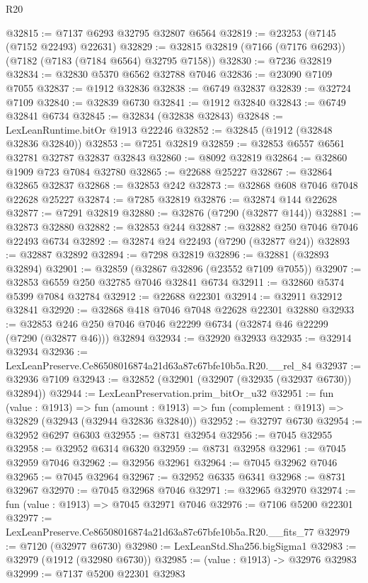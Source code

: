 \begin{lexlean}{R20}
\begin{coremodule}
{@32815 := @7137 @6293 @32795 @32807 @6564
@32819 := @23253 (@7145 (@7152 @22493) @22631)
@32829 := @32815 @32819 (@7166 (@7176 @6293)) (@7182 (@7183 (@7184 @6564) @32795 @7158))
@32830 := @7236 @32819
@32834 := @32830 @5370 @6562 @32788 @7046
@32836 := @23090 @7109 @7055
@32837 := @1912 @32836
@32838 := @6749 @32837
@32839 := @32724 @7109
@32840 := @32839 @6730
@32841 := @1912 @32840
@32843 := @6749 @32841 @6734
@32845 := @32834 (@32838 @32843)
@32848 := LexLeanRuntime.bitOr @1913 @22246
@32852 := @32845 (@1912 (@32848 @32836 @32840))
@32853 := @7251 @32819
@32859 := @32853 @6557 @6561 @32781 @32787 @32837 @32843
@32860 := @8092 @32819
@32864 := @32860 @1909 @723 @7084 @32780
@32865 := @22688 @25227
@32867 := @32864 @32865 @32837
@32868 := @32853 @242
@32873 := @32868 @608 @7046 @7048 @22628 @25227
@32874 := @7285 @32819
@32876 := @32874 @144 @22628
@32877 := @7291 @32819
@32880 := @32876 (@7290 (@32877 @144))
@32881 := @32873 @32880
@32882 := @32853 @244
@32887 := @32882 @250 @7046 @7046 @22493 @6734
@32892 := @32874 @24 @22493 (@7290 (@32877 @24))
@32893 := @32887 @32892
@32894 := @7298 @32819
@32896 := @32881 (@32893 @32894)
@32901 := @32859 (@32867 @32896 (@23552 @7109 @7055))
@32907 := @32853 @6559 @250 @32785 @7046 @32841 @6734
@32911 := @32860 @5374 @5399 @7084 @32784
@32912 := @22688 @22301
@32914 := @32911 @32912 @32841
@32920 := @32868 @418 @7046 @7048 @22628 @22301 @32880
@32933 := @32853 @246 @250 @7046 @7046 @22299 @6734 (@32874 @46 @22299 (@7290 (@32877 @46))) @32894
@32934 := @32920 @32933
@32935 := @32914 @32934
@32936 := LexLeanPreserve.Ce86508016874a21d63a87c67bfe10b5a.R20.__rel_84
@32937 := @32936 @7109
@32943 := @32852 (@32901 (@32907 (@32935 (@32937 @6730)) @32894))
@32944 := LexLeanPreservation.prim_bitOr_u32
@32951 := fun (value : @1913) =>
  fun (amount : @1913) => fun (complement : @1913) => @32829 (@32943 (@32944 @32836 @32840))
@32952 := @32797 @6730
@32954 := @32952 @6297 @6303
@32955 := @8731 @32954
@32956 := @7045 @32955
@32958 := @32952 @6314 @6320
@32959 := @8731 @32958
@32961 := @7045 @32959 @7046
@32962 := @32956 @32961
@32964 := @7045 @32962 @7046
@32965 := @7045 @32964
@32967 := @32952 @6335 @6341
@32968 := @8731 @32967
@32970 := @7045 @32968 @7046
@32971 := @32965 @32970
@32974 := fun (value : @1913) => @7045 @32971 @7046
@32976 := @7106 @5200 @22301
@32977 := LexLeanPreserve.Ce86508016874a21d63a87c67bfe10b5a.R20.__fits_77
@32979 := @7120 (@32977 @6730)
@32980 := LexLeanStd.Sha256.bigSigma1
@32983 := @32979 (@1912 (@32980 @6730))
@32985 := (value : @1913) -> @32976 @32983
@32999 := @7137
    @5200
    @22301
    @32983
}
\end{coremodule}
\end{lexlean}
